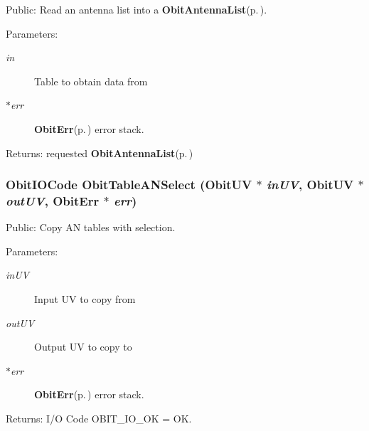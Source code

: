 Public: Read an antenna list into a {\bf Obit\-Antenna\-List}{\rm (p.\,\pageref{structObitAntennaList})}. 

\begin{Desc}
\item[Parameters:]
\begin{description}
\item[{\em in}]Table to obtain data from \item[{\em $\ast$err}]{\bf Obit\-Err}{\rm (p.\,\pageref{structObitErr})} error stack. \end{description}
\end{Desc}
\begin{Desc}
\item[Returns:]requested {\bf Obit\-Antenna\-List}{\rm (p.\,\pageref{structObitAntennaList})} \end{Desc}
\subsubsection{\setlength{\rightskip}{0pt plus 5cm}Obit\-IOCode Obit\-Table\-ANSelect ({\bf Obit\-UV} $\ast$ {\em in\-UV}, {\bf Obit\-UV} $\ast$ {\em out\-UV}, {\bf Obit\-Err} $\ast$ {\em err})}\label{ObitTableANUtil_8c_a2}


Public: Copy AN tables with selection. 

\begin{Desc}
\item[Parameters:]
\begin{description}
\item[{\em in\-UV}]Input UV to copy from \item[{\em out\-UV}]Output UV to copy to \item[{\em $\ast$err}]{\bf Obit\-Err}{\rm (p.\,\pageref{structObitErr})} error stack. \end{description}
\end{Desc}
\begin{Desc}
\item[Returns:]I/O Code OBIT\_\-IO\_\-OK = OK. \end{Desc}
